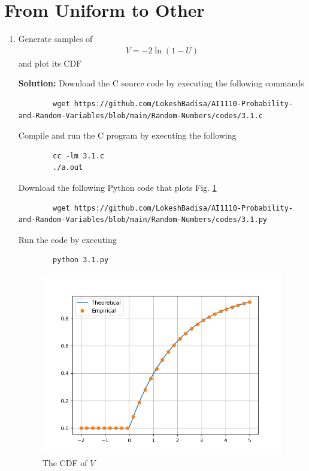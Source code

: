 \documentclass[journal,12pt,twocolumn]{IEEEtran}
\newcommand{\solution}{\noindent \textbf{Solution: }}
\providecommand{\brak}[1]{\ensuremath{\left(#1\right)}}
\numberwithin{equation}{section}
\renewcommand\thesection{\arabic{section}}
\begin{document}
	\section{From Uniform to Other}
	\begin{enumerate}[label=\thesection.\arabic*,ref=\thesection.\theenumi]
	\item Generate samples of 
	\begin{align}
		V = -2\ln\brak{1-U}
	\end{align}
	and plot its CDF
	
	\solution Download the C source code by executing the following commands
	\begin{lstlisting}
		wget https://github.com/LokeshBadisa/AI1110-Probability-and-Random-Variables/blob/main/Random-Numbers/codes/3.1.c
	\end{lstlisting}
	Compile and run the C program by executing the following
	\begin{lstlisting}
		cc -lm 3.1.c
		./a.out
	\end{lstlisting}
	Download the following Python code that plots Fig. \ref{fig-3.1}
	\begin{lstlisting}
		wget https://github.com/LokeshBadisa/AI1110-Probability-and-Random-Variables/blob/main/Random-Numbers/codes/3.1.py
	\end{lstlisting}
	Run the code by executing
	\begin{lstlisting}
		python 3.1.py
	\end{lstlisting}
	\begin{figure}
		\centering
		\includegraphics[width=\columnwidth]{./figs/3.1.png}
		\caption{The CDF of $V$}
		\label{fig-3.1}
	\end{figure}	
	

\end{enumerate}
\end{document}
